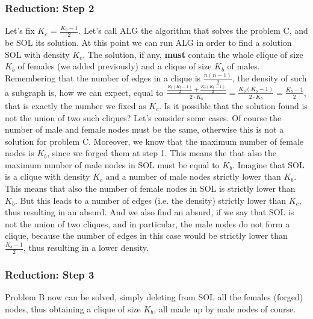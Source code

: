 \subsubsection{Reduction: Step 2}
Let's fix $K_c$ = $\frac{K_b-1}{2}$. Let's call ALG the algorithm that solves the problem C, and be SOL its solution.
At this point we can run ALG in order to find a solution SOL with density $K_c$. The solution, if any, \textbf{must} contain the whole clique of size $K_b$ of females (we added previously) and a clique of size $K_b$ of males. Remembering that the number of edges in a clique is $\frac{n(n-1)}{2}$, the density of such a subgraph is, how we can expect, equal to $\frac{\frac{K_b(K_b - 1)}{2} + \frac{K_b(K_b - 1)}{2}}{2 \cdot K_b}  = \frac{K_b(K_b - 1)}{2 \cdot K_b} = \frac{K_b - 1}{2}$, that is exactly the number we fixed as $K_c$.
\newline
Is it possible that the solution found is not the union of two such cliques? Let's consider some cases.
Of course the number of male and female nodes must be the same, otherwise this is not a solution for problem C. Moreover, we know that the maximum number of female nodes is $K_b$, since we forged them at step 1. This means the that also the maximum number of male nodes in SOL must be equal to $K_b$.
Imagine that SOL is a clique with density $K_c$ and a number of male nodes strictly lower than $K_b$. This means that also the number of female nodes in SOL is strictly lower than $K_b$. But this leads to a number of edges (i.e. the density) strictly lower than $K_c$, thus resulting in an absurd. And we also find an absurd, if we say that SOL is not the union of two cliques, and in particular, the male nodes do not form a clique, because the number of edges in this case would be strictly lower than $\frac{K_b -1}{2}$, thus resulting in a lower density.
\subsubsection{Reduction: Step 3}
Problem B now can be solved, simply deleting from SOL all the females (forged) nodes, thus obtaining a clique of size $K_b$, all made up by male nodes of course.
